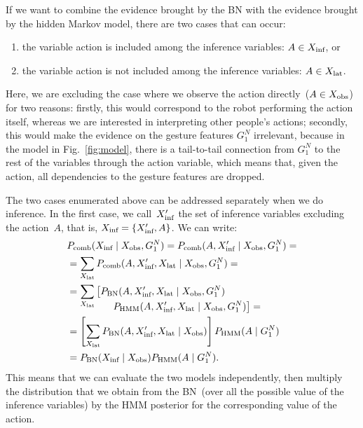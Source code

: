 If we want to combine the evidence brought by the \ac{BN} with the evidence brought by the hidden Markov model, there are two cases that can occur:
\begin{enumerate}
\item the variable action is included among the inference variables: $A \in X_\text{inf}$, or

\item the variable action is not included among the inference variables: $A \in X_\text{lat}$.
\end{enumerate}

Here, we are excluding the case where we observe the action directly~($A\in X_\text{obs}$) for two reasons: firstly, this would correspond to the robot performing the action itself, whereas we are interested in interpreting other people's actions;
secondly, this would make the evidence on the gesture features $G_1^N$ irrelevant, because in the model in Fig.~\ref{fig:model}, there is a tail-to-tail connection from $G_1^N$ to the rest of the variables through the action variable, which means that, given the action, all dependencies to the gesture features are dropped.

The two cases enumerated above can be addressed separately when we do inference.
In the first case, we call~$X_\text{inf}^\prime$ the set of inference variables excluding the action~$A$, that is, $X_\text{inf} = \{X_\text{inf}^\prime, A\}$.
We can write:
\begin{align*}
  & P_\text{comb}(X_\text{inf} \mid  X_\text{obs}, G_1^N) = P_\text{comb}(A, X_\text{inf}^\prime \mid  X_\text{obs}, G_1^N)= \\
  &= \sum_{X_\text{lat}} P_\text{comb}(A, X_\text{inf}^\prime, X_\text{lat} \mid X_\text{obs}, G_1^N)=\\
  &= \sum_{X_\text{lat}} \left[P_{\text{BN}}(A, X_\text{inf}^\prime, X_\text{lat} \mid X_\text{obs}, G_1^N)\right. \\[-4mm]
    & \mspace{80mu} \left.P_{\text{HMM}}(A, X_\text{inf}^\prime, X_\text{lat} \mid X_\text{obs}, G_1^N)\right]= \\
  &= \left[\sum_{X_\text{lat}} P_{\text{BN}}(A, X_\text{inf}^\prime, X_\text{lat} \mid X_\text{obs})\right] P_{\text{HMM}}(A \mid G_1^N) \\
  &= P_{\text{BN}}(X_\text{inf} \mid X_\text{obs}) P_{\text{HMM}}(A \mid G_1^N).
\end{align*}
This means that we can evaluate the two models independently, then multiply the distribution that we obtain from the \ac{BN}~(over all the possible value of the inference variables) by the \ac{HMM} posterior for the corresponding value of the action.

